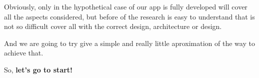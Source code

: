 \begin{flushleft}
Obviously, only in the hypothetical case of our app is fully developed will cover
all the aspects considered, but before of the research is easy to understand that
is not so difficult cover all with the correct design, architecture or design.

\bigskip
And we are going to try give a simple and really little aproximation of the way
to achieve that.

So, \textbf{let's go to start!}
\end{flushleft}
